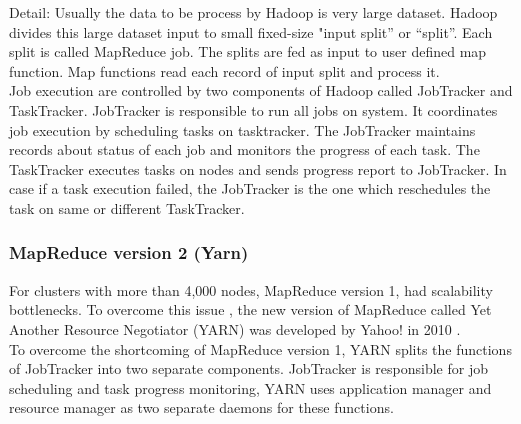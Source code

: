 Detail:
Usually the data to be process by Hadoop is very large dataset. Hadoop divides this large dataset input to small fixed-size "input split” or “split”. Each split is called MapReduce job. The splits are fed as input to user defined map function. Map functions read each record of input split and process it.\\

Job execution are controlled by two components of Hadoop called JobTracker and TaskTracker. JobTracker is responsible to run all jobs on system. It coordinates job execution by scheduling tasks on tasktracker. The JobTracker maintains records about status of each job and monitors the progress of each task. The TaskTracker executes tasks on nodes and sends progress report to JobTracker. In case if a task execution failed, the JobTracker is the one which reschedules the task on same or different TaskTracker.\\




















\subsubsection{MapReduce version 2 (Yarn)}

For clusters with more than 4,000 nodes, MapReduce version 1, had scalability bottlenecks. To overcome this issue , the new version of MapReduce called Yet Another Resource Negotiator (YARN) was developed by Yahoo!‌ in 2010 \cite{tom3}.\\  

 To overcome the shortcoming of MapReduce version 1, YARN splits the functions of JobTracker into two separate components. JobTracker is responsible for job scheduling and task progress monitoring, YARN‌ uses application manager and resource manager as two separate daemons for these functions. \\

